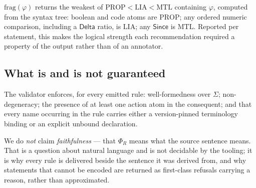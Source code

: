 $\mathrm{frag}(\varphi)$ returns the weakest of $\mathrm{PROP} <
\mathrm{LIA} < \mathrm{MTL}$ containing $\varphi$, computed from the syntax
tree: boolean and code atoms are $\mathrm{PROP}$; any ordered numeric
comparison, including a $\mathsf{Delta}$ ratio, is $\mathrm{LIA}$; any
$\mathsf{Since}$ is $\mathrm{MTL}$. Reported per statement, this makes the
logical strength each recommendation required a property of the output rather
than of an annotator.

\subsection{What is and is not guaranteed}

The validator enforces, for every emitted rule: well-formedness over $\Sigma$;
non-degeneracy; the presence of at least one action atom in the consequent; and
that every name occurring in the rule carries either a version-pinned
terminology binding or an explicit unbound declaration.

We do \emph{not} claim \emph{faithfulness} --- that $\Phi_R$ means what the
source sentence means. That is a question about natural language and is not
decidable by the tooling; it is why every rule is delivered beside the sentence
it was derived from, and why statements that cannot be encoded are returned as
first-class refusals carrying a reason, rather than approximated.
